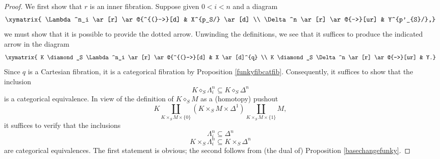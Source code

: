 \begin{proof}
We first show that $r$ is an inner fibration. Suppose given $0 < i < n$ and a diagram
$$ \xymatrix{ \Lambda^n_i \ar[r] \ar@{^{(}->}[d] & X^{p_S/} \ar[d] \\
\Delta^n \ar[r] \ar@{-->}[ur] & Y^{p'_{S}/},}$$
we must show that it is possible to provide the dotted arrow. Unwinding the definitions, we see that it suffices to produce the indicated arrow in the diagram
$$ \xymatrix{ K \diamond_S \Lambda^n_i \ar[r] \ar@{^{(}->}[d] & X \ar[d]^{q} \\
K \diamond_S \Delta^n \ar[r] \ar@{-->}[ur] & Y.}$$
Since $q$ is a Cartesian fibration, it is a categorical fibration by Proposition \ref{funkyfibcatfib}.
Consequently, it suffices to show that the inclusion
$$ K \diamond_S \Lambda^n_i \subseteq K \diamond_S \Delta^n$$ is a categorical equivalence. In view of the definition of $K \diamond_S M$ as a (homotopy) pushout
$$ K \coprod_{ K \times_S M \times \{0\}} (K \times_S M \times \Delta^1) \coprod_{ K \times_S M \times \{1\} } M,$$ it suffices to verify that the inclusions
$$ \Lambda^n_i \subseteq \Delta^n$$
$$ K \times_S \Lambda^n_i \subseteq K \times_S \Delta^n$$ 
are categorical equivalences. The first statement is obvious; the second follows from (the dual of) Proposition \ref{basechangefunky}.


\end{proof}
